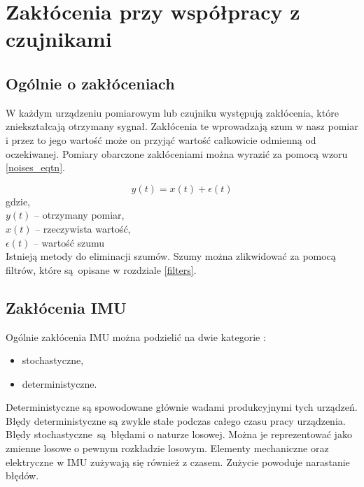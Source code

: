 \newpage
\section{Zakłócenia przy współpracy z czujnikami}
{
    \subsection{Ogólnie o zakłóceniach}
    {
        W każdym urządzeniu pomiarowym lub czujniku występują zakłócenia, które zniekształcają otrzymany sygnał. Zakłócenia te wprowadzają szum w nasz pomiar i przez to jego wartość może on przyjąć wartość całkowicie odmienną od oczekiwanej.
        Pomiary obarczone zakłóceniami można wyrazić za pomocą wzoru \ref{noises_eqtn}.

        \begin{equation}\label{noises_eqtn}
            y(t) = x(t) + \epsilon(t)
        \end{equation}
        gdzie,\\
        $y(t)$ -- otrzymany pomiar,\\
        $x(t)$ -- rzeczywista wartość,\\
        $\epsilon(t)$ -- wartość szumu\\

        Istnieją metody do eliminacji szumów. Szumy można zlikwidować za pomocą filtrów, które są opisane w rozdziale \ref{filters}. 
    }
       
    \label{imu_noises}
    \subsection{Zakłócenia IMU }
    {
        Ogólnie zakłócenia IMU można podzielić na dwie kategorie \cite{imu_noise}:
        \begin{itemize}
            \item stochastyczne,
            \item deterministyczne.
        \end{itemize}

        Deterministyczne są spowodowane głównie wadami produkcyjnymi tych urządzeń. Błędy deterministyczne są zwykle stałe podczas całego czasu pracy urządzenia.
        Błędy stochastyczne~są~błędami o naturze losowej. Można je reprezentować jako zmienne losowe o pewnym rozkładzie losowym.
        Elementy mechaniczne oraz elektryczne w IMU zużywają się również z czasem. Zużycie powoduje narastanie błędów.
            
}}
